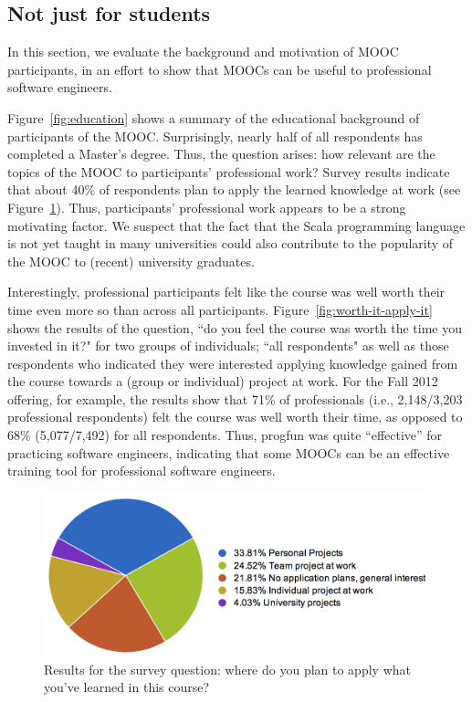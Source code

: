 \documentclass{sig-alternate}
\begin{document}
\pagebreak
\subsection{Not just for students}

In this section, we evaluate the background and motivation of MOOC participants,
in an effort to show that MOOCs can be useful to professional software engineers.

Figure~\ref{fig:education} shows a summary of the educational background of
participants of the MOOC. Surprisingly, nearly half of all respondents has completed a
Master's degree. Thus, the question arises: how relevant are the topics of the
MOOC to participants' professional work? Survey results indicate that about
40\% of respondents plan to apply the learned knowledge at work (see
Figure~\ref{fig:where-apply}). Thus, participants' professional work appears
to be a strong motivating factor. We suspect that the fact that the Scala
programming language is not yet taught in many universities could also
contribute to the popularity of the MOOC to (recent) university graduates.

Interestingly, professional participants felt like the course was well worth
their time even more so than across all participants. Figure~\ref{fig:worth-it-apply-it}
shows the results of the question, ``do you feel the course was worth the time you invested in it?"
for two groups of individuals; ``all respondents" as well as those respondents who
indicated they were interested applying knowledge gained from the course towards a
(group or individual) project at work. For the Fall 2012 offering, for example, the
results show that 71\% of professionals (i.e., 2,148/3,203 professional respondents)
felt the course was well worth their time, as opposed to 68\% (5,077/7,492) for all respondents.
Thus, progfun was quite ``effective'' for practicing software engineers, indicating
that some MOOCs can be an effective training tool for professional software engineers.

\begin{figure}[ht!]
  \centering
  \includegraphics[width=\columnwidth]{plots/where-apply.png}
  \caption{Results for the survey question: where do you plan to apply what you've learned in this course?}
  \label{fig:where-apply}
\end{figure}
\end{document}
